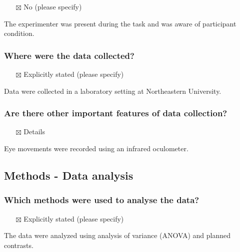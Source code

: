 \documentclass[
  doc, a4paper]{apa7}
\providecommand{\tightlist}{%
  \setlength{\itemsep}{0pt}\setlength{\parskip}{0pt}}
\begin{document}
\begin{itemize}
\tightlist
\item[$\boxtimes$]
  No (please specify)
\end{itemize}

The experimenter was present during the task and was aware of participant condition.

\subsubsection{Where were the data collected?}\label{where-were-the-data-collected}

\begin{itemize}
\tightlist
\item[$\boxtimes$]
  Explicitly stated (please specify)
\end{itemize}

Data were collected in a laboratory setting at Northeastern University.

\subsubsection{Are there other important features of data collection?}\label{are-there-other-important-features-of-data-collection}

\begin{itemize}
\tightlist
\item[$\boxtimes$]
  Details
\end{itemize}

Eye movements were recorded using an infrared oculometer.

\subsection{Methods - Data analysis}\label{methods---data-analysis}

\subsubsection{Which methods were used to analyse the data?}\label{which-methods-were-used-to-analyse-the-data}

\begin{itemize}
\tightlist
\item[$\boxtimes$]
  Explicitly stated (please specify)
\end{itemize}

The data were analyzed using analysis of variance (ANOVA) and planned contrasts.
\end{document}
